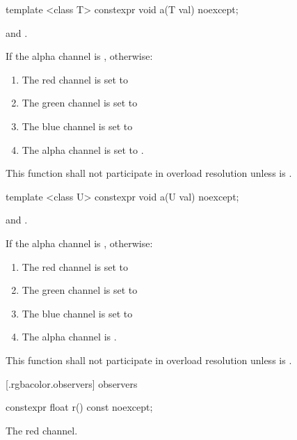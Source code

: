 %
\begin{itemdecl}
template <class T>
constexpr void a(T val) noexcept;
\end{itemdecl}
\begin{itemdescr}
\pnum
\requires
{} and .

\pnum
\effects
If  the alpha channel is , otherwise:
\begin{enumerate}
\item The red channel is set to 
\item The green channel is set to 
\item The blue channel is set to 
\item The alpha channel is set to .
\end{enumerate}

\pnum
\remarks
This function shall not participate in overload resolution unless  is .
\end{itemdescr}

%
\begin{itemdecl}
template <class U>
constexpr void a(U val) noexcept;
\end{itemdecl}
\begin{itemdescr}
\pnum
\requires
{} and .

\pnum
\effects
If  the alpha channel is , otherwise:
\begin{enumerate}
\item The red channel is set to 
\item The green channel is set to 
\item The blue channel is set to 
\item The alpha channel is .
\end{enumerate}

\pnum
\remarks
This function shall not participate in overload resolution unless  is .
\end{itemdescr}

 [\iotwod.rgbacolor.observers]{ observers}

%
\begin{itemdecl}
constexpr float r() const noexcept;
\end{itemdecl}
\begin{itemdescr}
\pnum
\returns
The red channel.
\end{itemdescr}

